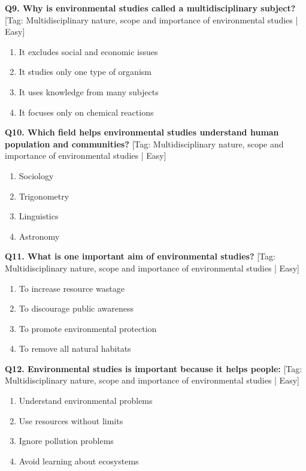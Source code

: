 \noindent\textbf{Q9. Why is environmental studies called a multidisciplinary subject?} \hfill [Tag: Multidisciplinary nature, scope and importance of environmental studies | Easy]
\begin{enumerate}[label=(\alph*),topsep=2pt,itemsep=1pt,partopsep=0pt,parsep=0pt]
    \item {It excludes social and economic issues}
    \item {It studies only one type of organism}
    \item {It uses knowledge from many subjects}
    \item {It focuses only on chemical reactions}
\end{enumerate}
\vspace{2mm}

\noindent\textbf{Q10. Which field helps environmental studies understand human population and communities?} \hfill [Tag: Multidisciplinary nature, scope and importance of environmental studies | Easy]
\begin{enumerate}[label=(\alph*),topsep=2pt,itemsep=1pt,partopsep=0pt,parsep=0pt]
    \item {Sociology}
    \item {Trigonometry}
    \item {Linguistics}
    \item {Astronomy}
\end{enumerate}
\vspace{2mm}

\noindent\textbf{Q11. What is one important aim of environmental studies?} \hfill [Tag: Multidisciplinary nature, scope and importance of environmental studies | Easy]
\begin{enumerate}[label=(\alph*),topsep=2pt,itemsep=1pt,partopsep=0pt,parsep=0pt]
    \item {To increase resource wastage}
    \item {To discourage public awareness}
    \item {To promote environmental protection}
    \item {To remove all natural habitats}
\end{enumerate}
\vspace{2mm}

\noindent\textbf{Q12. Environmental studies is important because it helps people:} \hfill [Tag: Multidisciplinary nature, scope and importance of environmental studies | Easy]
\begin{enumerate}[label=(\alph*),topsep=2pt,itemsep=1pt,partopsep=0pt,parsep=0pt]
    \item {Understand environmental problems}
    \item {Use resources without limits}
    \item {Ignore pollution problems}
    \item {Avoid learning about ecosystems}
\end{enumerate}
\vspace{2mm}

